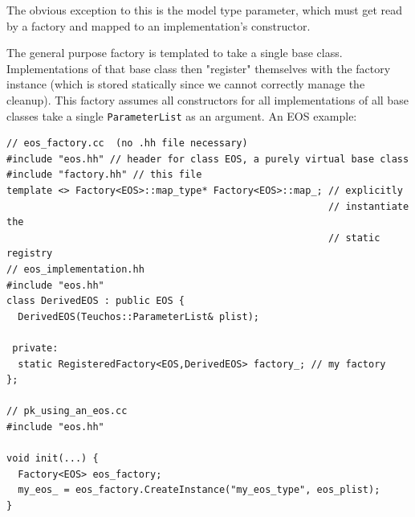 The obvious exception to this is the model type parameter, which must get
read by a factory and mapped to an implementation's constructor.

The general purpose factory is templated to take a
single base class.  Implementations of that base class then "register"
themselves with the factory instance (which is stored statically since we
cannot correctly manage the cleanup).  This factory assumes all
constructors for all implementations of all base classes take a single
{\tt ParameterList} as an argument. 
An EOS example:
\begin{lstlisting}
// eos_factory.cc  (no .hh file necessary)
#include "eos.hh" // header for class EOS, a purely virtual base class
#include "factory.hh" // this file
template <> Factory<EOS>::map_type* Factory<EOS>::map_; // explicitly
                                                        // instantiate the
                                                        // static registry
// eos_implementation.hh
#include "eos.hh"
class DerivedEOS : public EOS {
  DerivedEOS(Teuchos::ParameterList& plist);

 private:
  static RegisteredFactory<EOS,DerivedEOS> factory_; // my factory
};

// pk_using_an_eos.cc
#include "eos.hh"

void init(...) {
  Factory<EOS> eos_factory;
  my_eos_ = eos_factory.CreateInstance("my_eos_type", eos_plist);
}
\end{lstlisting}



